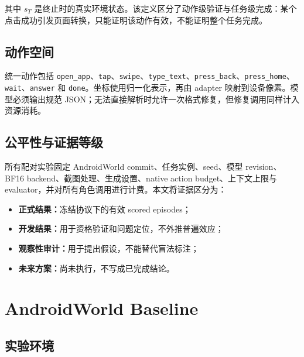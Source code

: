 \documentclass[12pt,a4paper]{ctexart}
\newcommand{\code}[1]{\texttt{#1}}
\begin{document}
其中 $s_T$ 是终止时的真实环境状态。该定义区分了动作级验证与任务级完成：某个点击成功引发页面转换，只能证明该动作有效，不能证明整个任务完成。

\subsection{动作空间}

统一动作包括 \code{open\_app}、\code{tap}、\code{swipe}、\code{type\_text}、\code{press\_back}、\code{press\_home}、\code{wait}、\code{answer} 和 \code{done}。坐标使用归一化表示，再由 adapter 映射到设备像素。模型必须输出规范 JSON；无法直接解析时允许一次格式修复，但修复调用同样计入资源消耗。

\subsection{公平性与证据等级}

所有配对实验固定 AndroidWorld commit、任务实例、seed、模型 revision、BF16 backend、截图处理、生成设置、native action budget、上下文上限与 evaluator，并对所有角色调用进行计费。本文将证据区分为：

\begin{itemize}[leftmargin=2em]
    \item \textbf{正式结果：}冻结协议下的有效 scored episodes；
    \item \textbf{开发结果：}用于资格验证和问题定位，不外推普遍效应；
    \item \textbf{观察性审计：}用于提出假设，不能替代盲法标注；
    \item \textbf{未来方案：}尚未执行，不写成已完成结论。
\end{itemize}

\section{AndroidWorld Baseline}

\subsection{实验环境}
\end{document}

